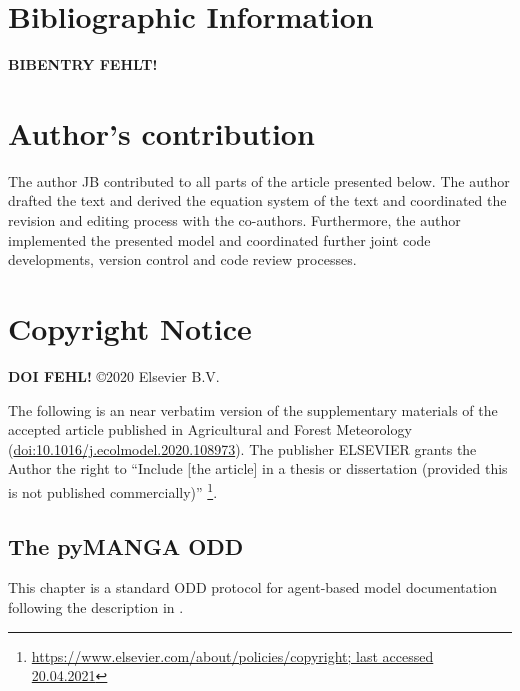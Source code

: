     \section{Bibliographic Information}
%
%
\textbf{BIBENTRY FEHLT!}
    
\section{Author's contribution}
The author JB contributed to all parts of the article presented below.
The author drafted the text and derived the equation system of the text and coordinated the revision and editing process with the co-authors. Furthermore, the author implemented the presented model and coordinated further joint code developments, version control and code review processes.
    
    \section{Copyright Notice}
    
    \textbf{DOI FEHL!}
    \copyright 2020 Elsevier B.V. 
    
    The following is an near verbatim version of the supplementary materials of the accepted article published in Agricultural and Forest Meteorology (\href{https://doi.org/10.1016/j.ecolmodel.2020.108973}{doi:10.1016/j.ecolmodel.2020.108973}). The publisher ELSEVIER grants the Author the right to ``Include [the article] in a thesis or dissertation (provided this is not published commercially)'' \footnote{\href{https://www.elsevier.com/about/policies/copyright}{https://www.elsevier.com/about/policies/copyright; last accessed 20.04.2021}}.    
    \clearpage
    

\subsection{The pyMANGA ODD }
This chapter is a standard ODD protocol for agent-based model documentation following the description in \citet{Grimm2020}.
